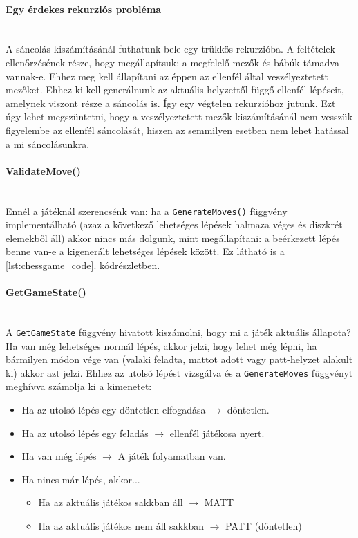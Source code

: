 \documentclass[twoside, a4paper, 12pt]{article}
\begin{document}
\paragraph{Egy érdekes rekurziós probléma} \mbox{} \\
A sáncolás kiszámításánál futhatunk bele egy trükkös rekurzióba. A feltételek ellenőrzésének része, hogy megállapítsuk: a megfelelő mezők és bábúk támadva vannak-e. Ehhez meg kell állapítani az éppen az ellenfél által veszélyeztetett mezőket. Ehhez ki kell generálnunk az aktuális helyzettől függő ellenfél lépéseit, amelynek viszont része a sáncolás is. Így egy végtelen rekurzióhoz jutunk. Ezt úgy lehet megszüntetni, hogy a veszélyeztetett mezők kiszámításánál nem vesszük figyelembe az ellenfél sáncolását, hiszen az semmilyen esetben nem lehet hatással a mi sáncolásunkra.

\paragraph{ValidateMove()} \mbox{} \\
Ennél a játéknál szerencsénk van: ha a \texttt{GenerateMoves()} függvény implementálható (azaz a következő lehetséges lépések halmaza véges és diszkrét elemekből áll) akkor nincs más dolgunk, mint megállapítani: a beérkezett lépés benne van-e a kigenerált lehetséges lépések között. Ez látható is a \ref{lst:chessgame_code}. kódrészletben.

\paragraph{GetGameState()} \mbox{} \\
A \texttt{GetGameState} függvény hivatott kiszámolni, hogy mi a játék aktuális állapota? Ha van még lehetséges normál lépés, akkor jelzi, hogy lehet még lépni, ha bármilyen módon vége van (valaki feladta, mattot adott vagy patt-helyzet alakult ki) akkor azt jelzi. Ehhez az utolsó lépést vizsgálva és a \texttt{GenerateMoves} függvényt meghívva számolja ki a kimenetet:

\begin{itemize}
	\item Ha az utolsó lépés egy döntetlen elfogadása $\to$ döntetlen.
	\item Ha az utolsó lépés egy feladás $\to$ ellenfél játékosa nyert.
	\item Ha van még lépés $\to$ A játék folyamatban van.
	\item Ha nincs már lépés, akkor...
	\begin{itemize}
		\item Ha az aktuális játékos sakkban áll $\to$ MATT
		\item Ha az aktuális játékos nem áll sakkban $\to$ PATT (döntetlen)
	\end{itemize}
\end{itemize}
\end{document}
